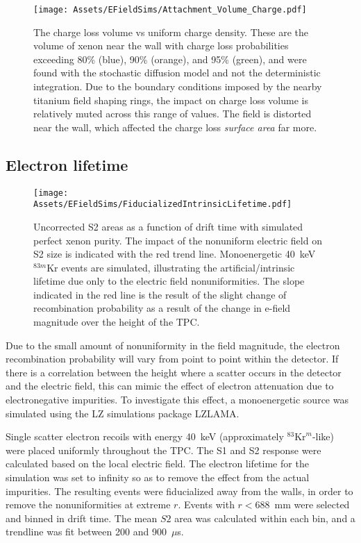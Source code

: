 \begin{figure}
    \centering
    \texttt{[image: Assets/EFieldSims/Attachment\_Volume\_Charge.pdf]}
    \caption[The charge loss volume vs uniform charge density.]%
    {The charge loss volume vs uniform charge density.
    These are the volume of xenon near the wall with charge loss probabilities exceeding 80\% (blue), 90\% (orange), and 95\% (green), and were found with the stochastic diffusion model and not the deterministic integration.
    Due to the boundary conditions imposed by the nearby titanium field shaping rings, the impact on charge loss volume is relatively muted across this range of values.
    The field is distorted near the wall, which affected the charge loss \textit{surface area} far more.}
    \label{fig:attachment_volume_charge}
\end{figure}


\subsection{Electron lifetime}
\begin{figure}
    \centering
    \texttt{[image: Assets/EFieldSims/FiducializedIntrinsicLifetime.pdf]}
    \caption[ Uncorrected S2 areas as a function of drift time with simulated perfect xenon purity. ]%
    { Uncorrected S2 areas as a function of drift time with simulated perfect xenon purity. 
    The impact of the nonuniform electric field on S2 size is indicated with the red trend line.
    Monoenergetic 40~keV $^{83m}$Kr events are simulated, illustrating the artificial/intrinsic lifetime due only to the electric field nonuniformities.
    The slope indicated in the red line is the result of the slight change of recombination probability as a result of the change in e-field magnitude over the height of the TPC.
    }
    \label{fig:field_lifetime}
\end{figure}
Due to the small amount of nonuniformity in the field magnitude, the electron recombination probability will vary from point to point within the detector. 
If there is a correlation between the height where a scatter occurs in the detector and the electric field, this can mimic the effect of electron attenuation due to electronegative impurities.
To investigate this effect, a monoenergetic source was simulated using the LZ simulations package LZLAMA.

Single scatter electron recoils with energy 40~keV (approximately $^{83}\text{Kr}^m$-like) were placed uniformly throughout the TPC.
The S1 and S2 response were calculated based on the local electric field. 
The electron lifetime for the simulation was set to infinity so as to remove the effect from the actual impurities.
The resulting events were fiducialized away from the walls, in order to remove the nonuniformities at extreme $r$.
Events with $r<688$~mm were selected and binned in drift time.
The mean $S2$ area was calculated within each bin, and a trendline was fit between 200 and 900~$\mu$s.

